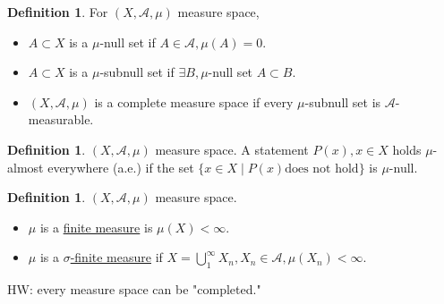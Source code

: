 \documentclass{report}
\theoremstyle{definition}
\newtheorem{definition}[theorem]{Definition}
\theoremstyle{remark}
\begin{document}
\begin{definition}
For $(X,  \mathcal{A}, \mu)$ measure space,
\begin{itemize}
\item
$A \subset X$ is a $\mu$-null set if $A \in \mathcal{A}, \mu(A)= 0.$
\item
$A \subset X$ is a $\mu$-subnull set if $\exists B, \mu$-null set $A \subset B.$
\item
$(X,  \mathcal{A}, \mu)$ is a complete measure space if every $\mu$-subnull set is $\mathcal{A}$-measurable.
\end{itemize}
\end{definition}

\begin{definition}$(X,  \mathcal{A}, \mu)$ measure space.
A statement $P(x), x \in X$ holds $\mu$-almost everywhere (a.e.) if the set $\{x \in X \mid P(x) \text{does not hold}\}$ is $\mu$-null.
\end{definition}

\begin{definition}$(X,  \mathcal{A}, \mu)$ measure space.
\begin{itemize}
\item
	$\mu$ is a \underline{finite measure} is $\mu(X) < \infty.$
\item
	$\mu$ is a \underline{$\sigma$-finite measure} if $X = \bigcup_1^\infty X_n, X_n \in \mathcal{A}, \mu(X_n) < \infty.$
\end{itemize}
\end{definition}
HW: every measure space can be "completed."
\end{document}
